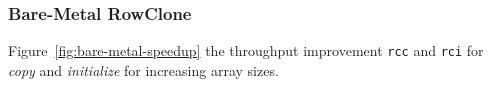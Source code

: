 
\subsubsection{Bare-Metal RowClone}

Figure~\ref{fig:bare-metal-speedup}  the throughput improvement  \texttt{rcc} {and \texttt{rci}} for \emph{copy} {and \emph{initialize}}   
for increasing array sizes. 

